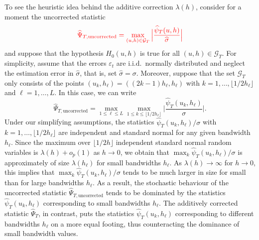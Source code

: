 To see the heuristic idea behind the additive correction $\lambda(h)$, consider for a moment the uncorrected statistic
\begin{equation}\label{multiscale-stat-uncorrected}
\textcolor{red}{\widehat{\Psi}_{T,\text{uncorrected}} = \max_{(u,h) \in \mathcal{G}_T} \Big|\frac{\widehat{\psi}_T(u,h)}{\widehat{\sigma}}\Big|} 
\end{equation}
and suppose that the hypothesis $H_0(u,h)$ is true for all $(u,h) \in \mathcal{G}_T$. For simplicity, assume that the errors $\varepsilon_t$ are i.i.d.\ normally distributed and neglect the estimation error in $\widehat{\sigma}$, that is, set $\widehat{\sigma} = \sigma$. Moreover, suppose that the set $\mathcal{G}_T$ only consists of the points $(u_k,h_\ell) = ((2k - 1)h_\ell,h_\ell)$ with $k = 1,\ldots,\lfloor 1/2h_\ell \rfloor$ and $\ell = 1,\ldots,L$. In this case, we can write
\[ \widehat{\Psi}_{T,\text{uncorrected}} = \max_{1 \le \ell \le L} \max_{1 \le k \le \lfloor 1/2h_\ell \rfloor} \Big|\frac{\widehat{\psi}_T(u_k,h_\ell)}{\sigma}\Big|. \]
Under our simplifying assumptions, the statistics $\widehat{\psi}_T(u_k,h_\ell)/\sigma$ with $k = 1,\ldots,\lfloor 1/2h_\ell \rfloor$ are independent and standard normal for any given bandwidth $h_\ell$. Since the maximum over $\lfloor 1/2h \rfloor$ independent standard normal random variables is $\lambda(h) + o_p(1)$ as $h \rightarrow 0$, we obtain that $\max_{k} \widehat{\psi}_T(u_k,h_\ell)/\sigma$ is approximately of size $\lambda(h_\ell)$ for small bandwidths $h_\ell$. As $\lambda(h) \rightarrow \infty$ for $h \rightarrow 0$, this implies that $\max_{k} \widehat{\psi}_T(u_k,h_\ell)/\sigma$ tends to be much larger in size for small than for large bandwidths $h_\ell$. As a result, the stochastic behaviour of the uncorrected statistic $\widehat{\Psi}_{T,\text{uncorrected}}$ tends to be dominated by the statistics $\widehat{\psi}_T(u_k,h_\ell)$ corresponding to small bandwidths $h_\ell$. The additively corrected statistic $\widehat{\Psi}_T$, in contrast, puts the statistics $\widehat{\psi}_T(u_k,h_\ell)$ corresponding to different bandwidths $h_\ell$ on a more equal footing, thus counteracting the dominance of small bandwidth values. 


